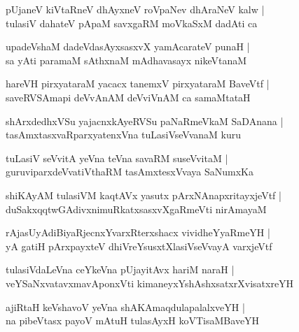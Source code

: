 \documentclass[twoside,12pt,openright]{book}
\newcounter{shloka}[chapter]
\begin{document}
\begin{shloka}%
pUjaneV kiVtaRneV dhAyxneV roVpaNev dhAraNeV kalw |\\
tulasiV dahateV pApaM savxgaRM moVkaSxM dadAti ca 
\end{shloka}

\begin{shloka}%
upadeVshaM dadeVdasAyxsasxvX yamAcarateV punaH |\\
sa yAti paramaM sAthxnaM mAdhavasayx nikeVtanaM 
\end{shloka}

\begin{shloka}%
hareVH pirxyataraM yacacx tanemxV pirxyataraM BaveVtf |\\
saveRVSAmapi deVvAnAM deVviVnAM ca samaMtataH 
\end{shloka}

\begin{shloka}%
shArxdedhxVSu yajacnxkAyeRVSu paNaRmeVkaM SaDAnana |\\
tasAmxtasxvaRparxyatenxVna tuLasiVseVvanaM kuru 
\end{shloka}

\begin{shloka}%
tuLasiV seVvitA yeVna teVna savaRM suseVvitaM |\\
guruviparxdeVvatiVthaRM tasAmxtesxVvaya SaNumxKa
\end{shloka}

\begin{shloka}%
shiKAyAM tulasiVM kaqtAVx yasutx pArxNAnapxritayxjeVtf |\\
duSakxqqtwGAdivxnimuRkatxsasxvXgaRmeVti nirAmayaM 
\end{shloka}

\begin{shloka}%
rAjasUyAdiBiyaRjecnxYvarxRterxshacx vividheYyaRmeYH |\\
yA gatiH pArxpayxteV dhiVreYsusxtXlasiVseVvayA varxjeVtf 
\end{shloka}

\begin{shloka}%
tulasiVdaLeVna ceYkeVna pUjayitAvx hariM naraH |\\
veYSaNxvatavxmavAponxVti kimaneyxYshAshxsatxrXvisatxreYH
\end{shloka}

\begin{shloka}%
ajiRtaH keVshavoV yeVna shAKAmaqdulapalalxveYH |\\
na pibeVtasx payoV mAtuH tulasAyxH koVTisaMBaveYH 
\end{shloka}
\end{document}
